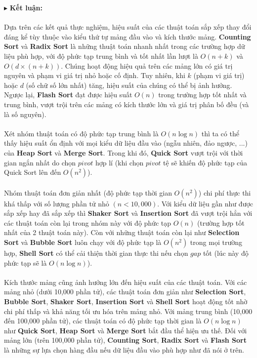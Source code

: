\pagebreak

$\blacktriangleright$ \textbf{Kết luận:}
\\\\
Dựa trên các kết quả thực nghiệm, hiệu suất của các thuật toán sắp xếp 
thay đổi đáng kể tùy thuộc vào kiểu thứ tự mảng đầu vào và kích thước 
mảng. \textbf{Counting Sort} và \textbf{Radix Sort} là những thuật toán nhanh nhất 
trong các trường hợp dữ liệu phù hợp, với độ phức tạp trung bình và tốt nhất 
lần lượt là $O\left(n+k\right)$ và $O\left(d\times\left(n+k\right)\right)$. 
Chúng hoạt động hiệu quả trên các mảng lớn có giá trị nguyên và phạm vi 
giá trị nhỏ hoặc cố định. Tuy nhiên, khi $k$ (phạm vi giá trị) hoặc $d$ 
(số chữ số lớn nhất) tăng, hiệu suất của chúng có thể bị ảnh hưởng. 
Ngược lại, \textbf{Flash Sort} đạt được hiệu suất $O\left(n\right)$ trong 
trường hợp tốt nhất và trung bình, vượt trội trên các mảng có kích thước 
lớn và giá trị phân bố đều (và là số nguyên).
\\\\
Xét nhóm thuật toán có độ phức tạp trung bình là $O\left(n\log{n}\right)$ 
thì ta có thể thấy hiệu suất ổn định với mọi kiểu dữ liệu đầu vào (ngẫu 
nhiên, đảo ngược, ...) của \textbf{Heap Sort} và \textbf{Merge Sort}. Trong khi đó, 
\textbf{Quick Sort} vượt trội với thời gian ngắn nhất do chọn $pivot$ hợp 
lí (khi chọn $pivot$ tệ sẽ khiến độ phức tạp của Quick Sort lên đến 
$O\left(n^2\right)$).
\\\\
Nhóm thuật toán đơn giản nhất (độ phức tạp thời gian $O\left(n^2\right)$) 
chi phí thực thi khá thấp với số lượng phần tử nhỏ $(n < 10,000)$. Với 
kiểu dữ liệu gần như được sắp xếp hay đã sắp xếp thì \textbf{Shaker Sort} và 
\textbf{Insertion Sort} đã vượt trội hẳn với các thuật toán còn lại trong 
nhóm này với độ phức tạp $O\left(n\right)$ (trường hợp tốt nhất của 2 
thuật toán này). Còn với những thuật toán còn lại như \textbf{Selection Sort} 
và \textbf{Bubble Sort} luôn chạy với độ phức tạp là $O\left(n^2\right)$ 
trong mọi trường hợp, \textbf{Shell Sort} có thể cải thiện thời gian thực 
thi nếu chọn $gap$ tốt (lúc này độ phức tạp sẽ là $O\left(n\log{n}\right)$).
\\\\
Kích thước mảng cũng ảnh hưởng lớn đến hiệu suất của các thuật toán. Với 
các mảng nhỏ (dưới 10,000 phần tử), các thuật toán đơn giản như 
\textbf{Selection Sort}, \textbf{Bubble Sort}, \textbf{Shaker Sort}, 
\textbf{Insertion Sort} và \textbf{Shell Sort} hoạt động tốt nhờ chi phí 
thấp và khả năng tối ưu hóa trên mảng nhỏ. Với mảng trung bình (10,000 đến 
100,000 phần tử), các thuật toán có độ phức tạp thời gian là 
$O\left(n\log{n}\right)$ như \textbf{Quick Sort}, \textbf{Heap Sort} và 
\textbf{Merge Sort} bắt đầu thể hiện ưu thế. Đối với mảng lớn (trên 
100,000 phần tử), \textbf{Counting Sort}, \textbf{Radix Sort} và 
\textbf{Flash Sort} là những sự lựa chọn hàng đầu nếu dữ liệu đầu vào 
phù hợp như đã nói ở trên.

